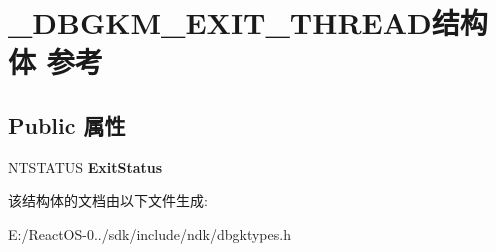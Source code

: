 \hypertarget{struct___d_b_g_k_m___e_x_i_t___t_h_r_e_a_d}{}\section{\+\_\+\+D\+B\+G\+K\+M\+\_\+\+E\+X\+I\+T\+\_\+\+T\+H\+R\+E\+A\+D结构体 参考}
\label{struct___d_b_g_k_m___e_x_i_t___t_h_r_e_a_d}
\subsection*{Public 属性}
\begin{DoxyCompactItemize}
\item 
\mbox{\label{struct___d_b_g_k_m___e_x_i_t___t_h_r_e_a_d_a72f9cd316b261cf76666b4848df22cd0}} 
N\+T\+S\+T\+A\+T\+US {\bfseries Exit\+Status}
\end{DoxyCompactItemize}


该结构体的文档由以下文件生成\+:\begin{DoxyCompactItemize}
\item 
E\+:/\+React\+O\+S-\/0../sdk/include/ndk/dbgktypes.\+h\end{DoxyCompactItemize}
